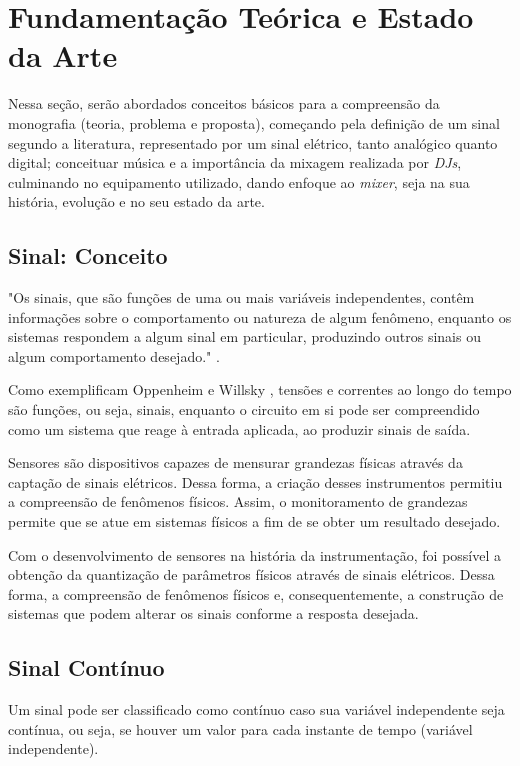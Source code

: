 \chapter[Fundamentação Teórica e Estado da Arte]{Fundamentação Teórica e Estado da Arte}
\label{cha:fundamentacao}
Nessa seção, serão abordados conceitos básicos para a compreensão da monografia (teoria, problema e proposta), começando pela definição de um sinal segundo a literatura, representado por um sinal elétrico, tanto analógico quanto digital; conceituar música e a importância da mixagem realizada por \textit{DJs}, culminando no equipamento utilizado, dando enfoque ao \textit{mixer}, seja na sua história, evolução e no seu estado da arte.

\section{Sinal: Conceito}

\begin{citacao}
"Os sinais, que são funções de uma ou mais variáveis independentes, contêm informações sobre o comportamento ou natureza de algum fenômeno, enquanto os sistemas respondem a algum sinal em particular, produzindo outros sinais ou algum comportamento desejado." \cite{oppenheim2010sinais}.
\end{citacao}

Como exemplificam Oppenheim e Willsky \cite{oppenheim2010sinais}, tensões e correntes ao longo do tempo são funções, ou seja, sinais, enquanto o circuito em si pode ser compreendido como um sistema que reage à entrada aplicada, ao produzir sinais de saída.

Sensores são dispositivos capazes de mensurar grandezas físicas através da captação de sinais elétricos. Dessa forma, a criação desses instrumentos permitiu a compreensão de fenômenos físicos. Assim, o monitoramento de grandezas permite que se atue em sistemas físicos a fim de se obter um resultado desejado.

Com o desenvolvimento de sensores na história da instrumentação, foi possível a obtenção da quantização de parâmetros físicos através de sinais elétricos. Dessa forma, a compreensão de fenômenos físicos e, consequentemente, a construção de sistemas que podem alterar os sinais conforme a resposta desejada.

\section{Sinal Contínuo}
Um sinal pode ser classificado como contínuo caso sua variável independente seja contínua, ou seja, se houver um valor para cada instante de tempo (variável independente).

